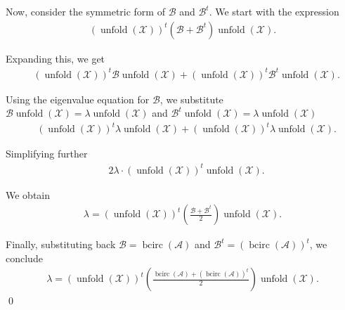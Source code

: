 \documentclass[oupthm]{CUP-JNL-BCM}%
\theoremstyle{oupplain}
\theoremstyle{oupdefinition}
\theoremstyle{oupremark}
\theoremstyle{oupproof}
\numberwithin{equation}{section}
\begin{document}
\noindent Now, consider the symmetric form of $\mathcal{B}$ and $\mathcal{B}^t$. We start with the expression
\begin{align*}  
(\operatorname{unfold}(\mathcal{X}))^t (\mathcal{B} + \mathcal{B}^t) \operatorname{unfold}(\mathcal{X}).  
\end{align*}  

\noindent Expanding this, we get
\begin{align*}  
& (\operatorname{unfold}(\mathcal{X}))^t \mathcal{B} \operatorname{unfold}(\mathcal{X}) + (\operatorname{unfold}(\mathcal{X}))^t \mathcal{B}^t \operatorname{unfold}(\mathcal{X}).  
\end{align*}  

\noindent Using the eigenvalue equation for $\mathcal{B}$, we substitute $\mathcal{B} \operatorname{unfold}(\mathcal{X}) = \lambda \operatorname{unfold}(\mathcal{X})$ and $\mathcal{B}^t \operatorname{unfold}(\mathcal{X}) = \lambda \operatorname{unfold}(\mathcal{X})$
\begin{align*}  
& (\operatorname{unfold}(\mathcal{X}))^t \lambda \operatorname{unfold}(\mathcal{X}) + (\operatorname{unfold}(\mathcal{X}))^t \lambda \operatorname{unfold}(\mathcal{X}).  
\end{align*}  

\noindent Simplifying further
\begin{align*}  
& 2 \lambda \cdot (\operatorname{unfold}(\mathcal{X}))^t \operatorname{unfold}(\mathcal{X}).  
\end{align*}  



\noindent We obtain
\begin{align*}  
\lambda = (\operatorname{unfold}(\mathcal{X}))^t \left(\frac{\mathcal{B} + \mathcal{B}^t}{2}\right) \operatorname{unfold}(\mathcal{X}).  
\end{align*}  

\noindent Finally, substituting back $\mathcal{B} = \operatorname{bcirc}(\mathcal{A})$ and $\mathcal{B}^t = (\operatorname{bcirc}(\mathcal{A}))^t$, we conclude
\begin{align*}  
\lambda = (\operatorname{unfold}(\mathcal{X}))^t \left(\frac{\operatorname{bcirc}(\mathcal{A}) + (\operatorname{bcirc}(\mathcal{A}))^t}{2}\right) \operatorname{unfold}(\mathcal{X}).  
\end{align*}  
\hfill \qed
\end{document}
